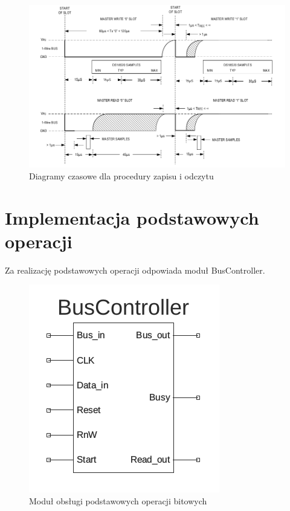 \documentclass[a4paper]{article}
\begin{document}
\begin{figure}[!h]
\begin{center}
\includegraphics[scale=0.5]{graphics/slots.png}
\end{center}
\label{slotsitming}
\caption{Diagramy czasowe dla procedury zapisu i odczytu}
\end{figure}

\section{Implementacja podstawowych operacji}

Za realizację podstawowych operacji odpowiada moduł BusController. 

\begin{figure}[!h]
\begin{center}
\includegraphics[scale=1.4]{graphics/bus_controller_sym.png}
\end{center}
\label{bus_controller_sym}
\caption{Moduł obsługi podstawowych operacji bitowych}
\end{figure}
\end{document}
